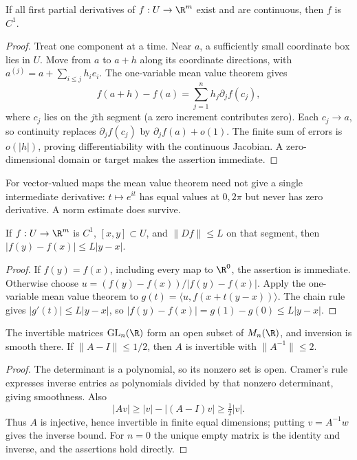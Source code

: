 \begin{proposition}\label{prop:partials}
If all first partial derivatives of $f:U\to\R^m$ exist and are continuous, then $f$ is $C^1$.
\end{proposition}
\begin{proof}
Treat one component at a time. Near $a$, a sufficiently small coordinate box lies in $U$. Move from $a$ to $a+h$ along its coordinate directions, with $a^{(j)}=a+\sum_{i\le j}h_ie_i$. The one-variable mean value theorem gives
\[
f(a+h)-f(a)=\sum_{j=1}^nh_j\partial_jf(c_j),
\]
where $c_j$ lies on the $j$th segment (a zero increment contributes zero). Each $c_j\to a$, so continuity replaces $\partial_jf(c_j)$ by $\partial_jf(a)+o(1)$. The finite sum of errors is $o(|h|)$, proving differentiability with the continuous Jacobian. A zero-dimensional domain or target makes the assertion immediate.
\end{proof}

For vector-valued maps the mean value theorem need not give a single intermediate derivative: $t\mapsto e^{it}$ has equal values at $0,2\pi$ but never has zero derivative. A norm estimate does survive.

\begin{lemma}\label{lem:mvi}
If $f:U\to\R^m$ is $C^1$, $[x,y]\subset U$, and $\|Df\|\le L$ on that segment, then $|f(y)-f(x)|\le L|y-x|$.
\end{lemma}
\begin{proof}
If $f(y)=f(x)$, including every map to $\R^0$, the assertion is immediate. Otherwise choose $u=(f(y)-f(x))/|f(y)-f(x)|$. Apply the one-variable mean value theorem to $g(t)=\langle u,f(x+t(y-x))\rangle$. The chain rule gives $|g'(t)|\le L|y-x|$, so
$|f(y)-f(x)|=g(1)-g(0)\le L|y-x|$.
\end{proof}

\begin{lemma}\label{lem:glnopen}
The invertible matrices $\mathrm{GL}_n(\R)$ form an open subset of $M_n(\R)$, and inversion is smooth there. If $\|A-I\|\le1/2$, then $A$ is invertible with $\|A^{-1}\|\le2$.
\end{lemma}
\begin{proof}
The determinant is a polynomial, so its nonzero set is open. Cramer's rule expresses inverse entries as polynomials divided by that nonzero determinant, giving smoothness. Also
\[
|Av|\ge|v|-|(A-I)v|\ge\tfrac12|v|.
\]
Thus $A$ is injective, hence invertible in finite equal dimensions; putting $v=A^{-1}w$ gives the inverse bound. For $n=0$ the unique empty matrix is the identity and inverse, and the assertions hold directly.
\end{proof}

